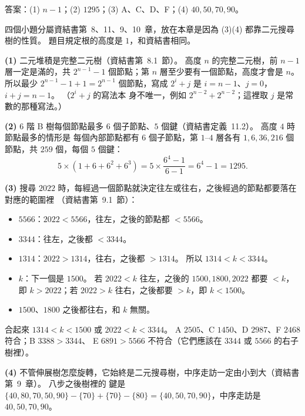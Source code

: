 \begin{pastsoln}
答案：(1) $n - 1$；(2) $1295$；(3) A、C、D、F；(4) $40, 50, 70, 90$。

四個小題分屬資結書第~8、11、9、10~章，放在本章是因為 (3)(4) 都靠二元搜尋樹的性質。 題目規定根的高度是
$1$，和資結書相同。

\textbf{(1)} 二元堆積是完整二元樹（資結書第~8.1~節）。 高度 $n$ 的完整二元樹，前 $n - 1$ 層一定是滿的，共
$2^{n-1} - 1$ 個節點；第 $n$ 層至少要有一個節點，高度才會是 $n$。 所以最少
$2^{n-1} - 1 + 1 = 2^{n-1}$ 個節點，寫成 $2^i + j$ 是 $i = n - 1$、$j = 0$，$i + j = n - 1$。 （$2^i + j$ 的寫法本
身不唯一，例如 $2^{n-2} + 2^{n-2}$；這裡取 $j$ 是常數的那種寫法。）

\textbf{(2)} $6$ 階 B 樹每個節點最多 $6$ 個子節點、$5$ 個鍵（資結書定義~11.2）。 高度 $4$ 時節點最多的情形是
每個內部節點都有 $6$ 個子節點，第 $1$--$4$ 層各有 $1, 6, 36, 216$ 個節點，共 $259$ 個，每個 $5$ 個鍵：
\[
5 \times (1 + 6 + 6^2 + 6^3) = 5 \times \frac{6^4 - 1}{6 - 1} = 6^4 - 1 = 1295.
\]

\textbf{(3)} 搜尋 $2022$ 時，每經過一個節點就決定往左或往右，之後經過的節點都要落在對應的範圍裡
（資結書第~9.1~節）：
\begin{itemize}
\item $5566$：$2022 < 5566$，往左，之後的節點都 $< 5566$。
\item $3344$：往左，之後都 $< 3344$。
\item $1314$：$2022 > 1314$，往右，之後都 $> 1314$。 所以 $1314 < k < 3344$。
\item $k$：下一個是 $1500$。 若 $2022 < k$ 往左，之後的 $1500, 1800, 2022$ 都要 $< k$，即 $k > 2022$；若
$2022 > k$ 往右，之後都要 $> k$，即 $k < 1500$。
\item $1500$、$1800$ 之後都往右，和 $k$ 無關。
\end{itemize}
合起來 $1314 < k < 1500$ 或 $2022 < k < 3344$。 A $2505$、C $1450$、D $2987$、F $2468$ 符合；B $3388 > 3344$、
E $6891 > 5566$ 不符合（它們應該在 $3344$ 或 $5566$ 的右子樹裡）。

\textbf{(4)} 不管伸展樹怎麼旋轉，它始終是二元搜尋樹，中序走訪一定由小到大（資結書第~9~章）。 八步之後樹裡的
鍵是 $\{40, 80, 70, 50, 90\} - \{70\} + \{70\} - \{80\} = \{40, 50, 70, 90\}$，中序走訪是 $40, 50, 70, 90$。


\end{pastsoln}
